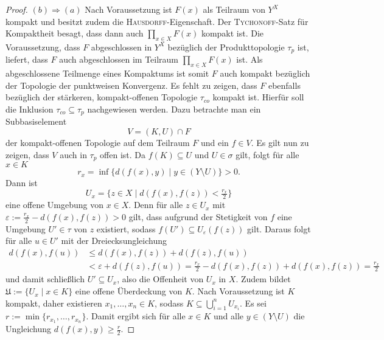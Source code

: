 \begin{proof}
  $(b) \Rightarrow (a)$
  Nach Voraussetzung ist $F(x)$ als Teilraum von $Y^X$ kompakt und besitzt zudem die \textsc{Hausdorff}-Eigenschaft.
  Der \textsc{Tychonoff}-Satz für Kompaktheit besagt, dass dann auch $\prod_{x \in X} F(x)$ kompakt ist.
  Die Voraussetzung, dass $F$ abgeschlossen in $Y^X$ bezüglich der Produkttopologie $\tau_p$ ist, liefert, dass $F$ auch abgeschlossen im Teilraum $\prod_{x \in X} F(x)$ ist.
  Als abgeschlossene Teilmenge eines Kompaktums ist somit $F$ auch kompakt bezüglich der Topologie der punktweisen Konvergenz.
  Es fehlt zu zeigen, dass $F$ ebenfalls bezüglich der stärkeren, kompakt-offenen Topologie $\tau_{co}$ kompakt ist.
  Hierfür soll die Inklusion $\tau_{co} \subseteq \tau_p$ nachgewiesen werden.
  Dazu betrachte man ein Subbasiselement 
  \begin{displaymath}
    V = (K,U) \cap F
  \end{displaymath}
  der kompakt-offenen Topologie auf dem Teilraum $F$ und ein $f \in V$.
  Es gilt nun zu zeigen, dass $V$ auch in $\tau_p$ offen ist.
  Da $f(K) \subseteq U$ und $U \in \sigma$ gilt, folgt für alle $x \in K$
  \begin{displaymath}
    r_x = \inf\{d(f(x),y) \mid y \in (Y \setminus U) \} > 0.
  \end{displaymath}
  Dann ist 
  \begin{displaymath}
    U_x = \{ z \in X \mid d(f(x),f(z)) < \tfrac{r_x}{2}\}
  \end{displaymath} 
  eine offene Umgebung von $x \in X$.
  Denn für alle $z \in U_x$ mit $\varepsilon := \tfrac{r_x}{2} - d(f(x),f(z)) > 0$ gilt, dass aufgrund der Stetigkeit von $f$ eine Umgebung $U' \in \tau$ von $z$ existiert, sodass $f(U') \subseteq U_\varepsilon(f(z))$ gilt.
  Daraus folgt für alle $u \in U'$ mit der Dreiecksungleichung
  \begin{align*}
    d(f(x),f(u)) &\leq d(f(x),f(z)) + d(f(z),f(u)) \\
                 &< \varepsilon + d(f(z),f(u)) = \frac{r_x}{2} - d(f(x),f(z)) + d(f(x),f(z)) =  \frac{r_x}{2}
  \end{align*}
  und damit schließlich $U' \subseteq U_x$, also die Offenheit von $U_x$ in $X$.
  Zudem bildet $\mathfrak{U} := \{U_x \mid x \in K\}$ eine offene Überdeckung von $K$. 
  Nach Voraussetzung ist $K$ kompakt, daher existieren $x_1,\dots,x_n \in K$, sodass $K \subseteq \bigcup_{i=1}^n U_{x_i}$.
  Es sei $r:= \min\{r_{x_1},\dots,r_{x_n}\}$. 
  Damit ergibt sich für alle $x \in K$ und alle $y \in (Y \setminus U)$ die Ungleichung $d(f(x),y) \geq \tfrac{r}{2}$.

\end{proof}
